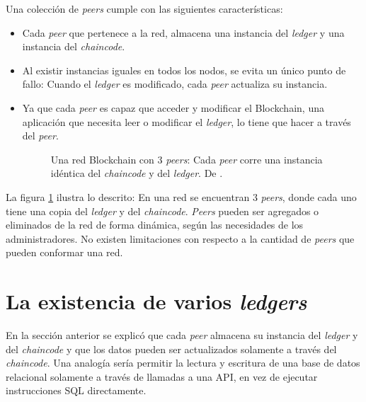 Una colección de \textit{peers} cumple con las siguientes características:
\begin{itemize}
    \item Cada \textit{peer} que pertenece a la red, almacena una instancia del \textit{ledger} y una instancia del \textit{chaincode}.
    \item Al existir instancias iguales en todos los nodos, se evita un único punto de fallo: Cuando el \textit{ledger} es modificado, cada \textit{peer} actualiza su instancia.
    \item Ya que cada \textit{peer} es capaz que acceder y modificar el Blockchain, una aplicación que necesita leer o modificar el \textit{ledger}, lo tiene que hacer a través del \textit{peer}.
    \begin{figure}[H] %
        \caption{Una red Blockchain con 3 \textit{peers}: Cada \textit{peer} corre una instancia idéntica del \textit{chaincode} y del \textit{ledger}. De \cite{hlf-peers}.}
        \label{fig:Selection_169}
    \end{figure}  
    
\end{itemize}
La figura \ref{fig:Selection_169} ilustra lo descrito: En una red se encuentran 3 \textit{peers}, donde cada uno tiene una copia del \textit{ledger} y del \textit{chaincode}. \textit{Peers} pueden ser agregados o eliminados de la red de forma dinámica, según las necesidades de los administradores. No existen limitaciones con respecto a la cantidad de \textit{peers} que pueden conformar una red.

\section{La existencia de varios \textit{ledgers}}
En la sección anterior se explicó que cada \textit{peer} almacena su instancia del \textit{ledger} y del \textit{chaincode} y que los datos pueden ser actualizados solamente a través del \textit{chaincode}. Una analogía sería permitir la lectura y escritura de una base de datos relacional solamente a través de llamadas a una API, en vez de ejecutar instrucciones SQL directamente.

